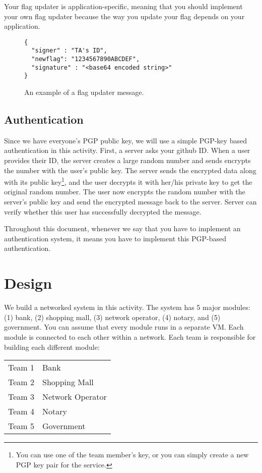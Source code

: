 \documentclass[a4paper, 11pt]{article}
\newcommand*{\Modone}{Bank\xspace}%
\newcommand*{\modone}{bank\xspace}%
\newcommand*{\Modtwo}{Shopping Mall\xspace}%
\newcommand*{\modtwo}{shopping mall\xspace}%
\newcommand*{\Modthree}{Network Operator\xspace}%
\newcommand*{\modthree}{network operator\xspace}%
\newcommand*{\Modfour}{Notary\xspace}%
\newcommand*{\modfour}{notary\xspace}%
\newcommand*{\Modfive}{Government\xspace}%
\newcommand*{\modfive}{government\xspace}%
\theoremstyle{definition}
\begin{document}
{Your flag updater is application-specific, meaning that you should
implement your own flag updater because the way you update your flag
depends on your application.

\begin{figure}[t]
\begin{lstlisting}[basicstyle=\ttfamily]
{
  "signer" : "TA's ID",
  "newflag": "1234567890ABCDEF",
  "signature" : "<base64 encoded string>"
}
\end{lstlisting}
\caption{An example of a flag updater message.}
\label{fig:flagupdater}
\end{figure}

\subsection{Authentication} \label{ss:auth}

Since we have everyone's PGP public key, we will use a simple PGP-key
based authentication in this activity. First, a server asks your
github ID. When a user provides their ID, the server creates a large
random number and sends encrypts the number with the user's public
key. The server sends the encrypted data along with its public
key\footnote{
%
  You can use one of the team member's key, or you can simply create a
  new PGP key pair for the service.
%
}, and the user decrypts it with her/his private key to get the
original random number. The user now encrypts the random number with
the server's public key and send the encrypted message back to the
server. Server can verify whether this user has successfully decrypted
the message.

Throughout this document, whenever we say that you have to implement
an authentication system, it means you have to implement this
PGP-based authentication.

\section{Design}

We build a networked system in this activity. The system has 5 major
modules: (1) \modone, (2) \modtwo, (3) \modthree, (4) \modfour, and
(5) \modfive. You can assume that every module runs in a separate VM.
Each module is connected to each other within a network. Each team is
responsible for building each different module:

\begin{center}
  \begin{tabular}{ll}
    Team 1 & \Modone \\
    Team 2 & \Modtwo \\
    Team 3 & \Modthree \\
    Team 4 & \Modfour \\
    Team 5 & \Modfive \\
  \end{tabular}
\end{center}

}
\end{document}
